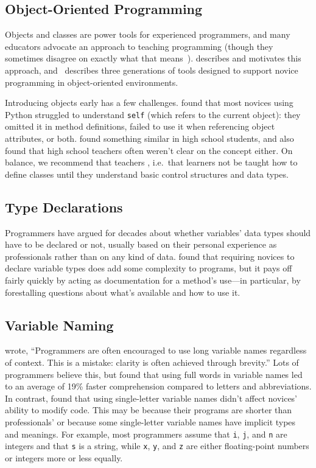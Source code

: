 \subsection*{Object-Oriented Programming}

Objects and classes are power tools for experienced programmers,
and many educators advocate an  approach to teaching programming
(though they sometimes disagree on exactly what that means~\cite{Benn2007b}).
\cite{Sorv2014} describes and motivates this approach,
and~\cite{Koll2015} describes three generations of tools
designed to support novice programming in object-oriented environments.

Introducing objects early has a few challenges.
\cite{Mill2016b} found that most novices using Python
struggled to understand \texttt{self}
(which refers to the current object):
they omitted it in method definitions,
failed to use it when referencing object attributes,
or both.
\cite{Rago2017} found something similar in high school students,
and also found that high school teachers often weren't clear on the concept either.
On balance,
we recommend that teachers ,
i.e.\ that learners not be taught how to define classes
until they understand basic control structures and data types.

\subsection*{Type Declarations}

Programmers have argued for decades about whether variables' data types should have to be declared or not,
usually based on their personal experience as professionals
rather than on any kind of data.
\cite{Endr2014,Fisc2015} found that requiring novices to declare variable types does add some complexity to programs,
but it pays off fairly quickly by acting as documentation for a method's use---in particular,
by forestalling questions about what's available and how to use it.

\subsection*{Variable Naming}

\cite{Kern1999} wrote,
``Programmers are often encouraged to use long variable names regardless of context.
This is a mistake: clarity is often achieved through brevity.''
Lots of programmers believe this,
but \cite{Hofm2017} found that using full words in variable names
led to an average of 19\% faster comprehension compared to letters and abbreviations.
In contrast,
\cite{Beni2017} found that using single-letter variable names didn't affect novices' ability to modify code.
This may be because their programs are shorter than professionals'
or because some single-letter variable names have implicit types and meanings.
For example,
most programmers assume that \texttt{i}, \texttt{j}, and \texttt{n} are integers
and that \texttt{s} is a string,
while \texttt{x}, \texttt{y}, and \texttt{z} are either floating-point numbers or integers
more or less equally.

